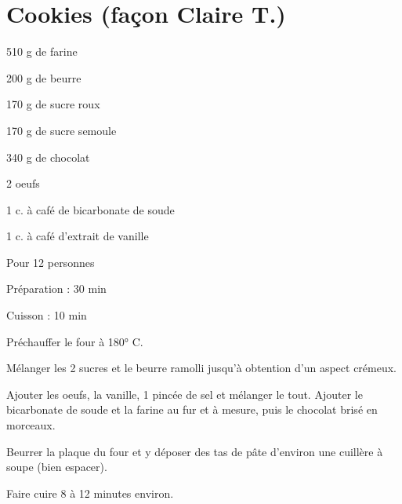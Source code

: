 \section[\normalsize{Cookies (façon Claire T.)}]{Cookies (façon Claire T.)}
\begin{ingredients}
\item 510 g de farine
\item 200 g de beurre
\item 170 g de sucre roux
\item 170 g de sucre semoule
\item 340 g de chocolat
\item 2 oeufs
\item 1 c. à café de bicarbonate de soude
\item 1 c. à café d'extrait de vanille
\end{ingredients}
\begin{infos}
\item Pour 12 personnes
\item Préparation : 30 min
\item Cuisson : 10 min
\end{infos}
\begin{etapes}
\item Préchauffer le four à 180° C.
\item Mélanger les 2 sucres et le beurre ramolli jusqu'à 
obtention d'un aspect crémeux.
\item Ajouter les oeufs, la vanille, 1 pincée de sel et mélanger 
le tout. Ajouter le bicarbonate de soude et la farine au fur et à mesure, puis le chocolat 
brisé en morceaux.
\item Beurrer la plaque du four et y déposer des tas de p\^ate 
d'environ une cuill\`ere à soupe (bien espacer).
\item Faire cuire 8 à 12 minutes environ.
\end{etapes}
\begin{conseils}
\end{conseils}
